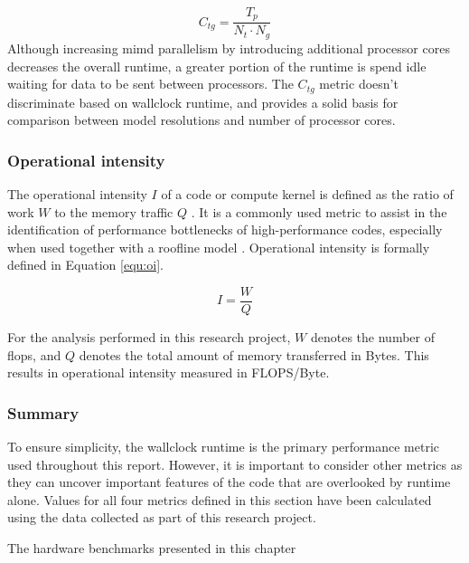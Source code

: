 \documentclass[a4paper,11pt]{report}
\begin{document}
\begin{equation}
C_{tg} = \frac{T_p}{N_t \cdot N_g}
\label{equ:cost}
\end{equation}
Although increasing \gls{mimd} parallelism by introducing additional processor cores decreases the overall runtime, a greater portion of the runtime is spend idle waiting for data to be sent between processors. The $C_{tg}$ metric doesn't discriminate based on wallclock runtime, and provides a solid basis for comparison between model resolutions and number of processor cores. 

\subsubsection{Operational intensity}
The operational intensity $I$ of a code or compute kernel is defined as the ratio of work $W$ to the memory traffic $Q$ \cite{williams2009roofline}. It is a commonly used metric to assist in the identification of performance bottlenecks of high-performance codes, especially when used together with a roofline model \cite{williams2009roofline}. Operational intensity is formally defined in Equation \ref{equ:oi}.

\begin{equation}
\label{equ:oi}
I = \frac{W}{Q}
\end{equation}
\par
For the analysis performed in this research project, $W$ denotes the number of \gls{flops}, and $Q$ denotes the total amount of memory transferred in Bytes. This results in operational intensity measured in FLOPS/Byte. 

\subsubsection{Summary}
To ensure simplicity, the wallclock runtime is the primary performance metric used throughout this report. However, it is important to consider other metrics as they can uncover important features of the code that are overlooked by runtime alone. Values for all four metrics defined in this section have been calculated using the data collected as part of this research project. 
\par
The hardware benchmarks presented in this chapter 



\let\textcircled=\pgftextcircled
\end{document}
